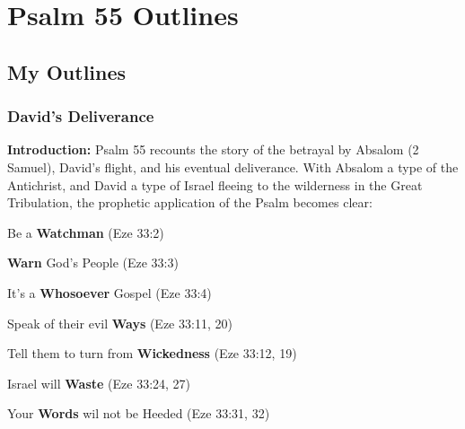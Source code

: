 \section{Psalm 55 Outlines}

\subsection{My Outlines}

\subsubsection{David's Deliverance}
\textbf{Introduction: }Psalm 55 recounts the story of the betrayal by Absalom (2 Samuel), David's flight, and his eventual deliverance. With Absalom a type of the Antichrist, and David a type of Israel fleeing to the wilderness in the Great Tribulation, the prophetic application of the Psalm becomes clear:

\begin{compactenum}[I.][8]
    \item  Be a \textbf{Watchman}   (Eze 33:2)
    \item  \textbf{Warn} God's People   (Eze 33:3)
    \item  It's a \textbf{Whosoever} Gospel   (Eze 33:4)
    \item  Speak of their evil \textbf{Ways}    (Eze 33:11, 20)
    \item  Tell them to turn from \textbf{Wickedness}   (Eze 33:12, 19)
    \item  Israel will \textbf{Waste}   (Eze 33:24, 27)
    \item  Your \textbf{Words} wil not be Heeded   (Eze 33:31, 32)
\end{compactenum}

